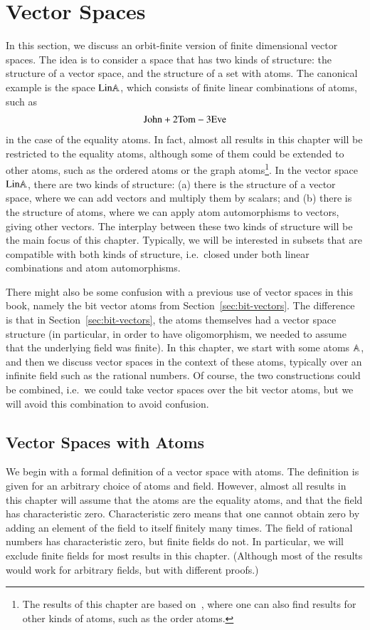 \chapter{Vector Spaces}
\label{chap:vector-spaces}

In this section, we discuss an orbit-finite version of finite dimensional vector spaces. The idea is to consider a space that has two kinds of structure: the structure of a vector space, and the structure of a set with atoms. The canonical example is the space $\mathrm{Lin} \mathbb A$, which consists of finite linear combinations of atoms, such as 
\begin{align*}
\text{John} + 2 \text{Tom} - 3 \text{Eve}
\end{align*}
in the case of the equality atoms. In fact, almost all results in this chapter will be restricted to the equality atoms, although some of them could be extended to other atoms, such as the ordered atoms or the graph atoms\footnote{
The results of this chapter are based on~\cite{orbitFiniteVectorTheoretics}, where one can also find results for other kinds of atoms, such as the order atoms.
}. In the vector space $\mathrm{Lin} \mathbb A$, there are two kinds of structure: (a) there is the structure of a vector space, where we can add vectors and multiply them by scalars; and (b) there is the structure of atoms, where we can apply atom automorphisms to vectors, giving other vectors. The interplay between these two kinds of structure will be the main focus of this chapter. Typically, we will be interested in subsets that are compatible with both kinds of structure, i.e.~closed  under both  linear combinations and atom automorphisms.

There might also be some confusion with a previous use of vector spaces in this book, namely the bit vector atoms from Section~\ref{sec:bit-vectors}. The difference is that in Section~\ref{sec:bit-vectors},  the atoms themselves had a vector space structure (in particular, in order to have oligomorphism, we needed to assume that the underlying field was finite). In this chapter, we start with some atoms $\mathbb A$, and then we discuss vector spaces in the context of these atoms, typically over an infinite field such as the rational numbers. Of course, the two constructions could be combined, i.e.~we could take vector spaces over the bit vector atoms, but we will avoid this combination to avoid confusion. 

\section{Vector Spaces with Atoms}
\label{sec:vector-spaces-with-atoms}
We begin with a formal definition of a vector space with atoms. The definition is given for an arbitrary choice of atoms and field. However, almost all results in this chapter will assume that the atoms are the equality atoms, and that the field has characteristic zero. Characteristic zero means that one cannot obtain zero by adding an element of the field to itself finitely many times. The field of rational numbers has characteristic zero, but finite fields do not. In particular, we will exclude finite fields for most results in this chapter. (Although most of the results would work for arbitrary fields, but with different proofs.)


